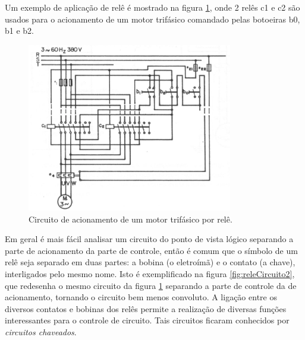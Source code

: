 Um exemplo de aplicação de relê é mostrado na figura \ref{fig:releCircuito1}, onde 2 relês c1 e c2 são usados para o acionamento de um motor trifásico comandado pelas botoeiras b0, b1 e b2.

\begin{figure}[hbt]
  \begin{center}
    \includegraphics[width=0.8\textwidth]{figuras/releCircuito1} %
  \end{center}
  \caption{Circuito de acionamento de um motor trifásico por relê.}
  \label{fig:releCircuito1}
\end{figure}

Em geral é mais fácil analisar um circuito do ponto de vista lógico separando a parte de acionamento da parte de controle, então é comum que o símbolo de um relê seja separado em duas partes: a bobina (o eletroímã) e o contato (a chave), interligados pelo mesmo nome. Isto é exemplificado na figura \ref{fig:releCircuito2}, que redesenha o mesmo circuito da figura \ref{fig:releCircuito1} separando a parte de controle da de acionamento, tornando o circuito bem menos convoluto. A ligação entre os diversos contatos e bobinas dos relês permite a realização de diversas funções interessantes para o controle de circuito. Tais circuitos ficaram conhecidos por \emph{circuitos chaveados}.

